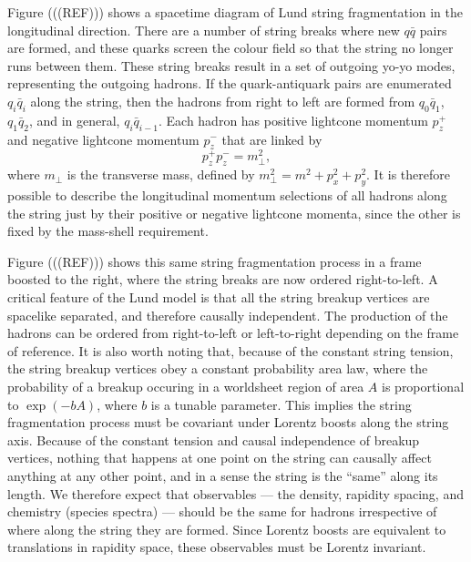 \documentclass[12pt,a4paper]{report}
\begin{document}
Figure (((REF))) shows a spacetime diagram of Lund string fragmentation in the longitudinal direction. There are a number of string breaks where new $q\bar{q}$ pairs are formed, and these quarks screen the colour field so that the string no longer runs between them. These string breaks result in a set of outgoing yo-yo modes, representing the outgoing hadrons. If the quark-antiquark pairs are enumerated $q_i \bar{q}_i$ along the string, then the hadrons from right to left are formed from $q_0 \bar{q}_1$, $q_1 \bar{q}_2$, and in general, $q_i \bar{q}_{i - 1}$. Each hadron has positive lightcone momentum $p_z^+$ and negative lightcone momentum $p_z^-$ that are linked by
\begin{equation}
  p_z^+ p_z^- = m_\perp^2,
\end{equation}
where $m_\perp$ is the transverse mass, defined by $m_\perp^2 = m^2 + p_x^2 + p_y^2$. It is therefore possible to describe the longitudinal momentum selections of all hadrons along the string just by their positive or negative lightcone momenta, since the other is fixed by the mass-shell requirement.

Figure (((REF))) shows this same string fragmentation process in a frame boosted to the right, where the string breaks are now ordered right-to-left. A critical feature of the Lund model is that all the string breakup vertices are spacelike separated, and therefore causally independent. The production of the hadrons can be ordered from right-to-left or left-to-right depending on the frame of reference. It is also worth noting that, because of the constant string tension, the string breakup vertices obey a constant probability area law, where the probability of a breakup occuring in a worldsheet region of area $A$ is proportional to $\exp(-bA)$, where $b$ is a tunable parameter. This implies the string fragmentation process must be covariant under Lorentz boosts along the string axis. Because of the constant tension and causal independence of breakup vertices, nothing that happens at one point on the string can causally affect anything at any other point, and in a sense the string is the ``same'' along its length. We therefore expect that observables --- the density, rapidity spacing, and chemistry (species spectra) --- should be the same for hadrons irrespective of where along the string they are formed. Since Lorentz boosts are equivalent to translations in rapidity space, these observables must be Lorentz invariant.
\end{document}
